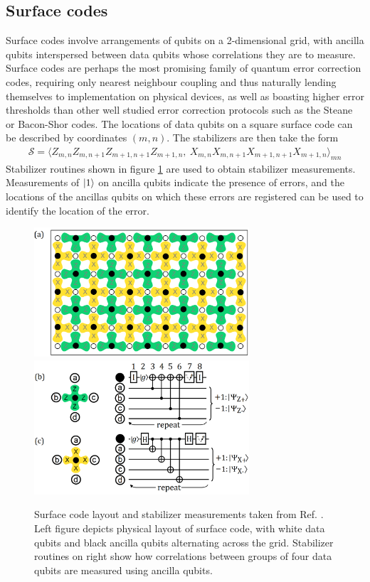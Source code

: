 \documentclass[../Thesis.tex]{subfiles}
\begin{document}
\subsection{Surface codes}

Surface codes involve arrangements of qubits on a 2-dimensional grid, with ancilla qubits interspersed between data qubits whose correlations they are to measure. Surface codes are perhaps the most promising family of quantum error correction codes, requiring only nearest neighbour coupling and thus naturally lending themselves to implementation on physical devices, as well as boasting higher error thresholds than other well studied error correction protocols such as the Steane or Bacon-Shor codes\cite{fowler_surface_2012}. 
The locations of data qubits on a square surface code can be described by coordinates $(m,n)$. The stabilizers are then take the form 
\begin{align}
    \mathcal{S} = \langle Z_{m,n}Z_{m,n+1}Z_{m+1,n+1}Z_{m+1,n},\  X_{m,n}X_{m,n+1}X_{m+1,n+1}X_{m+1,n}\rangle_{mn}
\end{align}
Stabilizer routines shown in figure \ref{fig:surface} are used to obtain stabilizer measurements. Measurements of $\ket{1}$ on ancilla qubits indicate the presence of errors, and  the locations of the ancillas qubits on which these errors are registered can be used to identify the location of the error.

\begin{figure}
    \centering
    \includegraphics[width=8cm]{graphics/Introduction/surfacecode.PNG}
    \includegraphics[width=8cm]{graphics/Introduction/surfacecode_stabilizers.PNG}
    \caption{Surface code layout and stabilizer measurements taken from Ref. \cite{fowler_surface_2012}. Left figure depicts physical layout of surface code, with white data qubits and black ancilla qubits alternating across the grid. Stabilizer routines on right show how correlations between groups of four data qubits are measured using ancilla qubits.}
    \label{fig:surface}
\end{figure}
\end{document}
